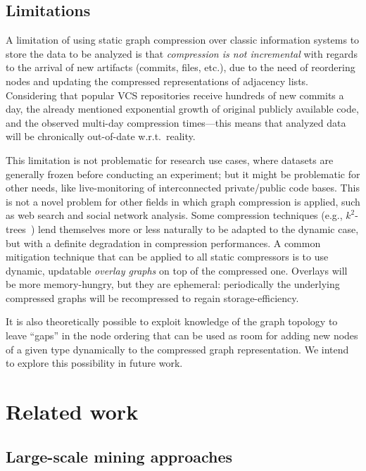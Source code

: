 \subsection{Limitations}%
\label{sec:compression-limitations}

A limitation of using static graph compression over classic information systems
to store the data to be analyzed is that \emph{compression is not incremental}
with regards to the arrival of new artifacts (commits, files, etc.), due to the
need of reordering nodes and updating the compressed representations of
adjacency lists. Considering that popular VCS repositories receive hundreds of
new commits a day, the already mentioned exponential growth of original
publicly available code, and the observed multi-day compression times---this
means that analyzed data will be chronically out-of-date w.r.t.~reality.

This limitation is not problematic for research use cases, where datasets are
generally frozen before conducting an experiment; but it might be problematic
for other needs, like live-monitoring of interconnected private/public code
bases. This is not a novel problem for other fields in which graph compression
is applied, such as web search and social network analysis. Some compression
techniques (e.g., $k^2$-trees~\cite{brisaboa2017compressed}) lend themselves
more or less naturally to be adapted to the dynamic case, but with a definite
degradation in compression performances. A common mitigation technique that can
be applied to all static compressors is to use dynamic, updatable \emph{overlay
  graphs} on top of the compressed one. Overlays will be more memory-hungry,
but they are ephemeral: periodically the underlying compressed graphs will be
recompressed to regain storage-efficiency.

It is also theoretically possible to exploit knowledge of the graph topology to
leave ``gaps'' in the node ordering that can be used as room for adding new
nodes of a given type dynamically to the compressed graph representation. We
intend to explore this possibility in future work.

\section{Related work}%
\label{sec:compression-related}

\subsection{Large-scale mining approaches}

